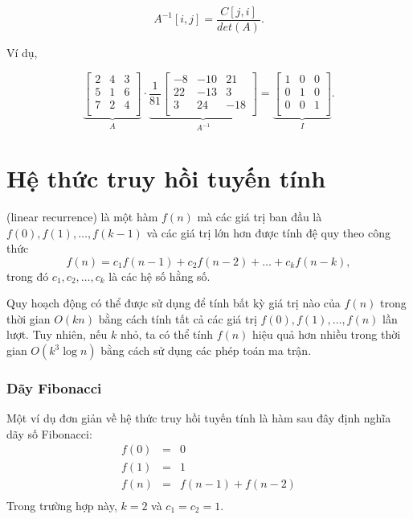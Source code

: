 \[A^{-1}[i,j] = \frac{C[j,i]}{det(A)}.\]

Ví dụ,

\[
\underbrace{
 \begin{bmatrix}
  2 & 4 & 3\\
  5 & 1 & 6\\
  7 & 2 & 4\\
 \end{bmatrix}
}_{A}
\cdot
\underbrace{
 \frac{1}{81}
 \begin{bmatrix}
   -8 & -10 & 21 \\
   22 & -13 & 3 \\
   3 & 24 & -18 \\
 \end{bmatrix}
}_{A^{-1}}
=
\underbrace{
 \begin{bmatrix}
  1 & 0 & 0 \\
  0 & 1 & 0 \\
  0 & 0 & 1 \\
 \end{bmatrix}
}_{I}.
\]

\section{Hệ thức truy hồi tuyến tính}


 (linear recurrence)
là một hàm $f(n)$
mà các giá trị ban đầu là
$f(0),f(1),\ldots,f(k-1)$
và các giá trị lớn hơn
được tính đệ quy theo công thức
\[f(n) = c_1 f(n-1) + c_2 f(n-2) + \ldots + c_k f (n-k),\]
trong đó $c_1,c_2,\ldots,c_k$ là các hệ số hằng số.

Quy hoạch động có thể được sử dụng để tính
bất kỳ giá trị nào của $f(n)$ trong thời gian $O(kn)$ bằng cách tính
tất cả các giá trị $f(0),f(1),\ldots,f(n)$ lần lượt.
Tuy nhiên, nếu $k$ nhỏ, ta có thể tính
$f(n)$ hiệu quả hơn nhiều trong thời gian $O(k^3 \log n)$
bằng cách sử dụng các phép toán ma trận.

\subsubsection{Dãy Fibonacci}


Một ví dụ đơn giản về hệ thức truy hồi tuyến tính là 
hàm sau đây định nghĩa dãy số Fibonacci:
\[
\begin{array}{lcl}
f(0) & = & 0 \\
f(1) & = & 1 \\
f(n) & = & f(n-1)+f(n-2) \\
\end{array}
\]
Trong trường hợp này, $k=2$ và $c_1=c_2=1$.

